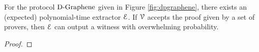 {%
%	
\begin{lemma}
	For the protocol $\text{D-Graphene}$ given in Figure \ref{fig:dpgraphene}, there exists an (expected) polynomial-time extractor $\mathcal{E}$. If $\mathcal{V}$ accepts the proof given by a set of provers, then $\mathcal{E}$ can output a witness with overwhelming probability.
\end{lemma}
\begin{proof}
\end{proof}}

